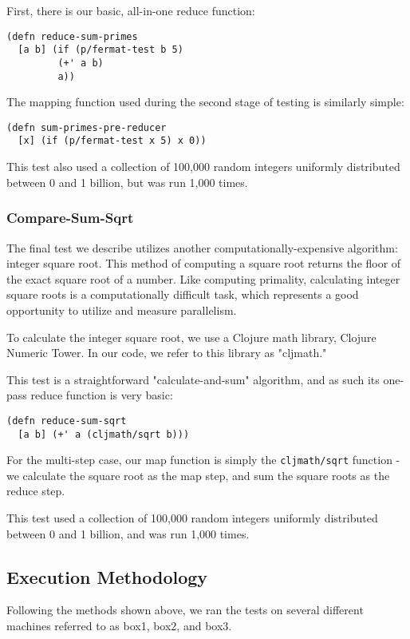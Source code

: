 \documentclass[12pt]{article}
\begin{document}
First, there is our basic, all-in-one reduce function:

\begin{verbatim}
(defn reduce-sum-primes
  [a b] (if (p/fermat-test b 5)
         (+' a b)
         a))
\end{verbatim}

The mapping function used during the second stage of testing is similarly simple:

\begin{verbatim}
(defn sum-primes-pre-reducer
  [x] (if (p/fermat-test x 5) x 0))
\end{verbatim}

This test also used a collection of 100,000 random integers uniformly distributed between 0 and 1 billion, but was run 1,000 times.
 
\subsubsection{Compare-Sum-Sqrt}\label{sec:sum-sqrt}
 
The final test we describe utilizes another computationally-expensive algorithm: integer square root. This method of computing a square root returns the floor of the exact square root of a number. Like computing primality, calculating integer square roots is a computationally difficult task, which represents a good opportunity to utilize and measure parallelism. 

To calculate the integer square root, we use a Clojure math library, Clojure Numeric Tower. In our code, we refer to this library as "cljmath."

This test is a straightforward "calculate-and-sum" algorithm, and as such its one-pass reduce function is very basic:

\begin{verbatim}
(defn reduce-sum-sqrt
  [a b] (+' a (cljmath/sqrt b)))
\end{verbatim}

For the multi-step case, our map function is simply the \texttt{cljmath/sqrt} function - we calculate the square root as the map step, and sum the square roots as the reduce step.
 
This test used a collection of 100,000 random integers uniformly distributed between 0 and 1 billion, and was run 1,000 times.
 
 \subsection{Execution Methodology}\label{sec:eMethods}
 Following the methods shown above, we ran the tests on several different machines referred to as box1, box2, and box3.
 
\end{document}
